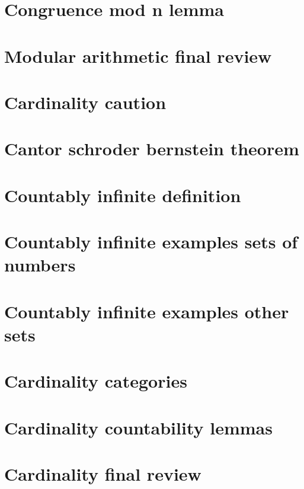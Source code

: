 \section*{Congruence mod n lemma}

\vfill
\section*{Modular arithmetic final review}

\vfill
\section*{Cardinality caution}

\vfill
\section*{Cantor schroder bernstein theorem}

\vfill
\section*{Countably infinite definition}

\vfill
\section*{Countably infinite examples sets of numbers}

\vfill
\section*{Countably infinite examples other sets}

\vfill
\section*{Cardinality categories}

\vfill
\section*{Cardinality countability lemmas}

\vfill
\section*{Cardinality final review}

\vfill

